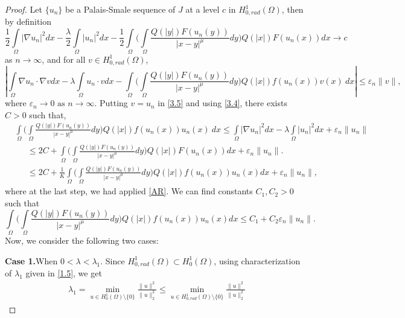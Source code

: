 \documentclass[11pt]{amsart}
\numberwithin{equation}{section}
\newenvironment{case}[1]{\par\noindent\textbf{Case 1.}\space#1}{}
\newcommand{\h}{H^1_0(\Omega)}
\newcommand{\hr}{H^1_{0, rad}(\Omega)}
\newcommand{\1}{\frac{1}{2}}
\begin{document}
	\begin{proof}
		Let $\{u_n\}$ be a Palais-Smale sequence of $J$ at a level $c$ in $\hr$, then by definition 
		\begin{equation}
			\1 \int\limits_\Omega |\nabla u_n|^2 dx -\frac{\lambda}{2}  \int\limits_\Omega |u_n|^2 dx - \1 \int\limits_\Omega \Bigg( \int\limits_\Omega \frac{Q(|y|)F(u_n(y))}{|x-y|^\mu} dy \Bigg) Q(|x|)F(u_n(x)) dx \rightarrow c  \label{3.4}
		\end{equation}  as $n \rightarrow \infty$, and for all $v \in \hr$,
		\begin{equation}
			\left| \int\limits_\Omega \nabla u_n \cdot \nabla v dx -\lambda\int\limits_\Omega u_n \cdot v dx -\int\limits_\Omega \Bigg( \int\limits_\Omega \frac{Q(|y|)F(u_n(y))}{|x-y|^\mu} dy\Bigg) Q(|x|)f(u_n(x))v(x)\ dx \right| \leq \varepsilon_n \|v\|,  \label{3.5}
		\end{equation}
		where $\varepsilon_n \rightarrow 0 \text{ as } n \rightarrow \infty$. Putting $v=u_n$ in \eqref{3.5} and using \eqref{3.4}, there exists $C>0$ such that,
		\begin{align}
			&\int\limits_\Omega \Bigg( \int\limits_\Omega \frac{Q(|y|)F(u_n(y))}{|x-y|^\mu} dy\Bigg) Q(|x|)f(u_n(x)) u_n(x)\ dx \leq \int\limits_\Omega |\nabla u_n|^2 dx - \lambda \int\limits_\Omega |u_n|^2 dx + \varepsilon_n \|u_n\| \nonumber\\
			& \quad \ \ \leq 2C + \int\limits_\Omega \Bigg( \int\limits_\Omega \frac{Q(|y|)F(u_n(y))}{|x-y|^\mu} dy \Bigg) Q(|x|)F(u_n(x)) dx + \varepsilon_n \|u_n\|. \nonumber\\
			& \quad \ \ \leq 2C + \frac{1}{K} \int\limits_\Omega \Bigg( \int\limits_\Omega \frac{Q(|y|)F(u_n(y))}{|x-y|^\mu} dy\Bigg) Q(|x|)f(u_n(x)) u_n(x) dx + \varepsilon_n \|u_n\| \nonumber,
		\end{align}
		where at the last step, we had applied \eqref{AR}. We can find constants $C_1, C_2>0$ such that
		\begin{equation}
			\int\limits_\Omega \Bigg( \int\limits_\Omega \frac{Q(|y|)F(u_n(y))}{|x-y|^\mu} dy\Bigg) Q(|x|)f(u_n(x)) u_n(x) dx \leq C_1 + C_2 \varepsilon_n \|u_n\|.  \label{3.6}
		\end{equation}
		Now, we consider the following two cases:
		\begin{case}
			When $0< \lambda < \lambda_1$.
		\end{case}	
		Since $\hr \subset \h$, using characterization of $\lambda_1$ given in \eqref{1.5}, we get
		\begin{align*}
			\lambda_1 = \min_{u\in \h \setminus \{0\}} \frac{\|u\|^2}{\|u\|^2_2} \leq \min_{u\in \hr \setminus \{0\}} \frac{\|u\|^2}{\|u\|^2_2}

\end{align*}
\end{proof}
\end{document}

